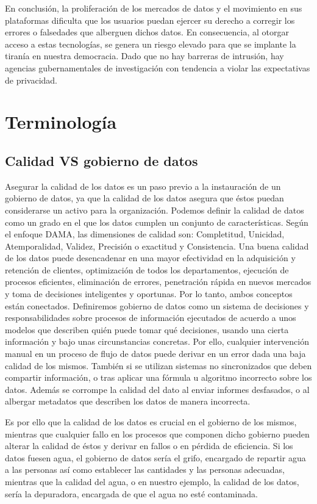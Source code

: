 \documentclass{article}
\begin{document}
En conclusión, la proliferación de los mercados de datos y el movimiento en sus plataformas dificulta que los usuarios puedan ejercer su derecho a corregir los errores o falsedades que alberguen dichos datos. En consecuencia, al otorgar acceso a estas tecnologías, se genera un riesgo elevado para que se implante la tiranía en nuestra democracia. Dado que no hay barreras de intrusión, hay agencias gubernamentales de investigación con tendencia a violar las expectativas de privacidad.

\section{Terminología}
\subsection{Calidad VS gobierno de datos}
Asegurar la calidad de los datos es un paso previo a la instauración de un gobierno de datos, ya que la calidad de los datos asegura que éstos puedan considerarse un activo para la organización. Podemos definir la calidad de datos como un grado en el que los datos cumplen un conjunto de características. Según el enfoque DAMA, las dimensiones de calidad son: Completitud, Unicidad, Atemporalidad, Validez, Precisión o exactitud y Consistencia.
Una buena calidad de los datos puede desencadenar en una mayor efectividad en la adquisición y retención de clientes, optimización de todos los departamentos, ejecución de procesos eficientes, eliminación de errores, penetración rápida en nuevos mercados y toma de decisiones inteligentes y oportunas. Por lo tanto, ambos conceptos están conectados. Definiremos gobierno de datos como un sistema de decisiones y responsabilidades sobre procesos de información ejecutados de acuerdo a unos modelos que describen quién puede tomar qué decisiones, usando una cierta información y bajo unas circunstancias concretas. Por ello, cualquier intervención manual en un proceso de flujo de datos puede derivar en un error dada una baja calidad de los mismos. También si se utilizan sistemas no sincronizados que deben compartir información, o tras aplicar una fórmula u algoritmo incorrecto sobre los datos. Además se corrompe la calidad del dato al enviar informes desfasados, o al albergar metadatos que describen los datos de manera incorrecta.

Es por ello que la calidad de los datos es crucial en el gobierno de los mismos, mientras que cualquier fallo en los procesos que componen dicho gobierno pueden alterar la calidad de éstos y derivar en fallos o en pérdida de eficiencia. Si los datos fuesen agua, el gobierno de datos sería el grifo, encargado de repartir agua a las personas así como establecer las cantidades y las personas adecuadas, mientras que la calidad del agua, o en nuestro ejemplo, la calidad de los datos, sería la depuradora, encargada de que el agua no esté contaminada.
\end{document}
